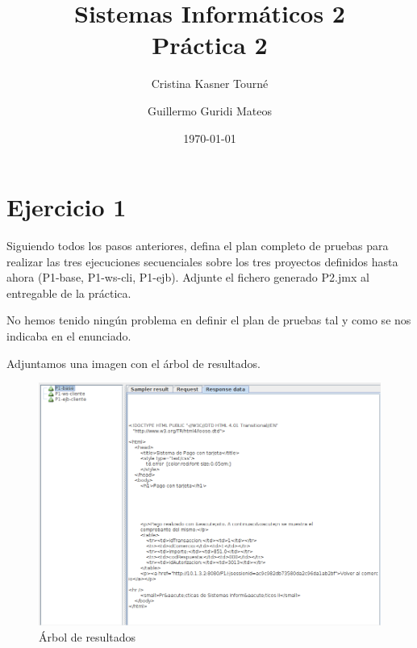 \documentclass[a4paper, 10pt]{article}
\title{Sistemas Informáticos 2\\Práctica 2}
\author{Cristina Kasner Tourné\and Guillermo Guridi Mateos}
\date{\today}
\begin{document}

\section{Ejercicio 1}
\begin{mdframed} 
Siguiendo todos los pasos anteriores, defina el plan completo de pruebas para realizar las tres 
ejecuciones secuenciales sobre los tres proyectos definidos hasta ahora (P1-base, P1-ws-cli, P1-ejb). 
Adjunte el fichero generado P2.jmx al entregable de la práctica. 
\end{mdframed}
No hemos tenido ningún problema en definir el plan de pruebas tal y como se nos indicaba en el enunciado.

Adjuntamos una imagen con el árbol de resultados.

\begin{figure}[hbtp]
	 	\centering
	 	\includegraphics[width=1.1\textwidth]{../../p2/pantallazos/ejemplo_tree_result.png}
	 	\caption {Árbol de resultados}
	 \end{figure}

\pagebreak
\end{document}
